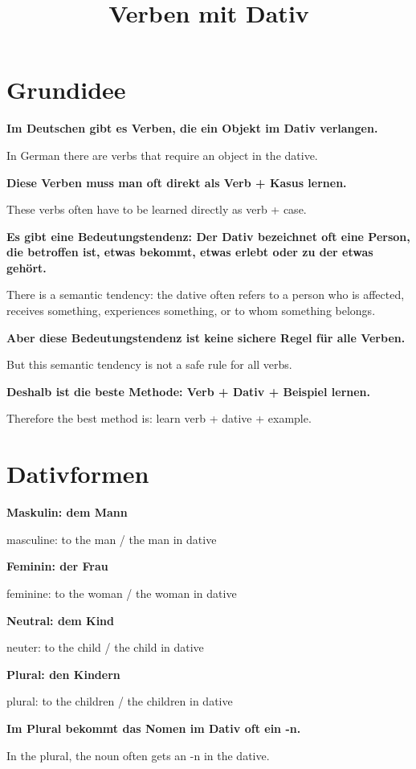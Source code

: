\documentclass[a4paper]{article}
\title{Verben mit Dativ}
\date{}
\newcommand{\EN}[1]{\par{\small\textcolor{TranslationGray}{#1}}\vspace{0.4em}}
\begin{document}
    \maketitle
    
    
    \section{Grundidee}
        
        \textbf{Im Deutschen gibt es Verben, die ein Objekt im Dativ verlangen.}
        \EN{In German there are verbs that require an object in the dative.}
        
        \textbf{Diese Verben muss man oft direkt als Verb + Kasus lernen.}
        \EN{These verbs often have to be learned directly as verb + case.}
        
        \textbf{Es gibt eine Bedeutungstendenz: Der Dativ bezeichnet oft eine Person, die betroffen ist, etwas bekommt, etwas erlebt oder zu der etwas gehört.}
        \EN{There is a semantic tendency: the dative often refers to a person who is affected, receives something, experiences something, or to whom something belongs.}
        
        \textbf{Aber diese Bedeutungstendenz ist keine sichere Regel für alle Verben.}
        \EN{But this semantic tendency is not a safe rule for all verbs.}
        
        \textbf{Deshalb ist die beste Methode: Verb + Dativ + Beispiel lernen.}
        \EN{Therefore the best method is: learn verb + dative + example.}
    
    
    \section{Dativformen}
        
        \textbf{Maskulin: dem Mann}
        \EN{masculine: to the man / the man in dative}
        
        \textbf{Feminin: der Frau}
        \EN{feminine: to the woman / the woman in dative}
        
        \textbf{Neutral: dem Kind}
        \EN{neuter: to the child / the child in dative}
        
        \textbf{Plural: den Kindern}
        \EN{plural: to the children / the children in dative}
        
        \textbf{Im Plural bekommt das Nomen im Dativ oft ein -n.}
        \EN{In the plural, the noun often gets an -n in the dative.}
        
\end{document}
